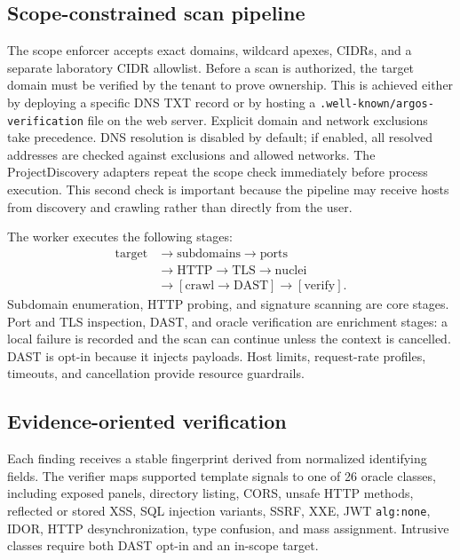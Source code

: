 \documentclass[conference,a4paper]{IEEEtran}
\newcommand{\code}[1]{\texttt{#1}}
\begin{document}
\subsection{Scope-constrained scan pipeline}

The scope enforcer accepts exact domains, wildcard apexes, CIDRs, and a separate laboratory CIDR allowlist. Before a scan is authorized, the target domain must be verified by the tenant to prove ownership. This is achieved either by deploying a specific DNS TXT record or by hosting a \code{.well-known/argos-verification} file on the web server. Explicit domain and network exclusions take precedence. DNS resolution is disabled by default; if enabled, all resolved addresses are checked against exclusions and allowed networks. The ProjectDiscovery adapters repeat the scope check immediately before process execution. This second check is important because the pipeline may receive hosts from discovery and crawling rather than directly from the user.

The worker executes the following stages:
\begin{equation}
\begin{split}
\mathrm{target} &\rightarrow \mathrm{subdomains} \rightarrow \mathrm{ports} \\
&\rightarrow \mathrm{HTTP} \rightarrow \mathrm{TLS} \rightarrow \mathrm{nuclei} \\
&\rightarrow [\mathrm{crawl} \rightarrow \mathrm{DAST}] \rightarrow [\mathrm{verify}].
\end{split}
\label{eq:pipeline}
\end{equation}
Subdomain enumeration, HTTP probing, and signature scanning are core stages. Port and TLS inspection, DAST, and oracle verification are enrichment stages: a local failure is recorded and the scan can continue unless the context is cancelled. DAST is opt-in because it injects payloads. Host limits, request-rate profiles, timeouts, and cancellation provide resource guardrails.

\subsection{Evidence-oriented verification}

Each finding receives a stable fingerprint derived from normalized identifying fields. The verifier maps supported template signals to one of 26 oracle classes, including exposed panels, directory listing, CORS, unsafe HTTP methods, reflected or stored XSS, SQL injection variants, SSRF, XXE, JWT \code{alg:none}, IDOR, HTTP desynchronization, type confusion, and mass assignment. Intrusive classes require both DAST opt-in and an in-scope target.
\end{document}
